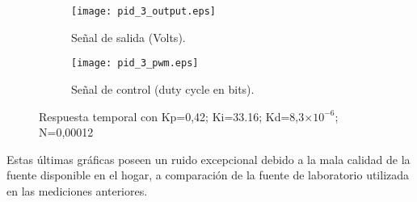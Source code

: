 \begin{figure}[H]
    \centering

    \begin{subfigure}[b]{0.49\textwidth}
        \centering
        \texttt{[image: pid\_3\_output.eps]}
        \caption{Señal de salida (Volts).}
        \label{fig:pid3_micro}
    \end{subfigure}
    \begin{subfigure}[b]{0.49\textwidth}
        \centering
        \texttt{[image: pid\_3\_pwm.eps]}
        \caption{Señal de control (duty cycle en bits).}
        \label{fig:pid_3_pwm}
    \end{subfigure}

    \vspace{-0.25cm}
    \caption{Respuesta temporal con Kp=0,42; Ki=33.16; Kd=8,3$\times 10^{-6}$; N=0,00012}
    \label{fig:pid3}
\end{figure}
\vspace{-0.5cm}

Estas últimas gráficas poseen un ruido excepcional debido a la mala calidad de la fuente disponible en el hogar,
a comparación de la fuente de laboratorio utilizada en las mediciones anteriores.